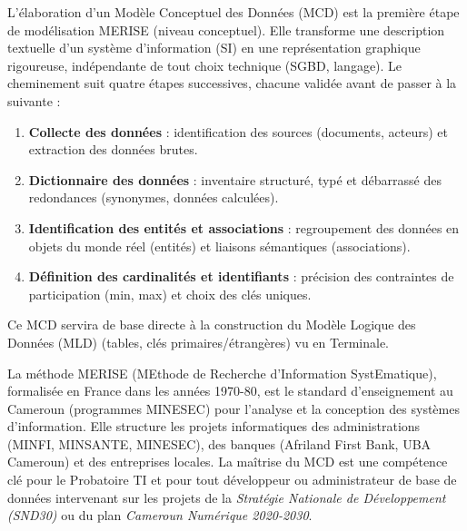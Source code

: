 \documentclass[11pt]{article}
\newcommand{\cle}[1]{{\popxbold\color{popdark}#1}}
\begin{document}
\begin{aretenir}
L'élaboration d'un \cle{Modèle Conceptuel des Données (MCD)} est la première étape de modélisation \cle{MERISE} (niveau conceptuel). Elle transforme une description textuelle d'un système d'information (SI) en une représentation graphique rigoureuse, indépendante de tout choix technique (SGBD, langage). Le cheminement suit quatre étapes successives, chacune validée avant de passer à la suivante :
\begin{enumerate}
  \item \textbf{Collecte des données} : identification des sources (documents, acteurs) et extraction des données brutes.
  \item \textbf{Dictionnaire des données} : inventaire structuré, typé et débarrassé des redondances (synonymes, données calculées).
  \item \textbf{Identification des entités et associations} : regroupement des données en objets du monde réel (entités) et liaisons sémantiques (associations).
  \item \textbf{Définition des cardinalités et identifiants} : précision des contraintes de participation (min, max) et choix des clés uniques.
\end{enumerate}
Ce MCD servira de base directe à la construction du \cle{Modèle Logique des Données (MLD)} (tables, clés primaires/étrangères) vu en Terminale.
\end{aretenir}

\begin{savaistu}
La méthode \cle{MERISE} (MEthode de Recherche d'Information SystEmatique), formalisée en France dans les années 1970-80, est le standard d'enseignement au Cameroun (programmes MINESEC) pour l'analyse et la conception des systèmes d'information. Elle structure les projets informatiques des administrations (MINFI, MINSANTE, MINESEC), des banques (Afriland First Bank, UBA Cameroun) et des entreprises locales. La maîtrise du MCD est une compétence clé pour le Probatoire TI et pour tout développeur ou administrateur de base de données intervenant sur les projets de la \emph{Stratégie Nationale de Développement (SND30)} ou du plan \emph{Cameroun Numérique 2020-2030}.
\end{savaistu}
\end{document}
